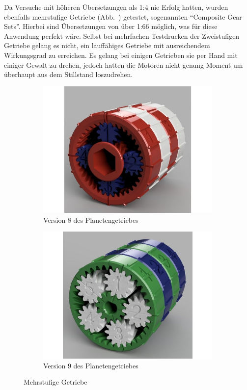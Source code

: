 Da Versuche mit höheren Übersetzungen als 1:4 nie Erfolg hatten, wurden ebenfalls mehrstufige Getriebe (Abb.~\label{bild:compgetr}) getestet, sogenannten ``Composite Gear Sets''.
Hierbei sind Übersetzungen von über 1:66 möglich, was für diese Anwendung perfekt wäre. 
Selbst bei mehrfachen Testdrucken der Zweistufigen Getriebe gelang es nicht, ein lauffähiges Getriebe mit ausreichendem Wirkungsgrad zu erreichen.
Es gelang bei einigen Getrieben sie per Hand mit einiger Gewalt zu drehen, jedoch hatten die Motoren nicht genung Moment um überhaupt aus dem Stillstand loszudrehen.

\begin{figure}[!ht]
	\centering
	\begin{subfigure}[b]{0.4\textwidth}
		\includegraphics[width=\textwidth]{bilder/GetriebeVersion5-1.jpg}
		\caption{Version 8 des Planetengetriebes \cite{link:planetgear5-1}}
		\label{bild:gearversion5-1}
	\end{subfigure}
	\hspace{0.1\textwidth}%
	\begin{subfigure}[b]{0.4\textwidth}
		\includegraphics[width=\textwidth]{bilder/GetriebeVersion5-2.jpg}
		\caption{Version 9 des Planetengetriebes \cite{link:planetgear5-2}}
		\label{bild:gearversion5-2}
	\end{subfigure}
	\caption{Mehrstufige Getriebe}
	\label{bild:compgetr}
\end{figure}

